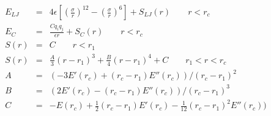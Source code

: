 


\begin{eqnarray*}
E_{LJ} & = & 4 \epsilon \left[ \left(\frac{\sigma}{r}\right)^{12} - 
                       \left(\frac{\sigma}{r}\right)^6 \right] + S_{LJ}(r)
                       \qquad r < r_c \\
E_C & = & \frac{C q_i q_j}{\epsilon  r} + S_C(r) \qquad r < r_c \\
S(r) & = & C \qquad r < r_1 \\
S(r) & = & \frac{A}{3} (r - r_1)^3 + \frac{B}{4} (r - r_1)^4 + C \qquad  r_1 < r < r_c \\
A & = & (-3 E'(r_c) + (r_c - r_1) E''(r_c))/(r_c - r_1)^2 \\
B & = & (2 E'(r_c) - (r_c - r_1) E''(r_c))/(r_c - r_1)^3 \\
C & = & -E(r_c) + \frac{1}{2} (r_c - r_1) E'(r_c) - \frac{1}{12} (r_c - r_1)^2 E''(r_c)) \\
\end{eqnarray*}                           


